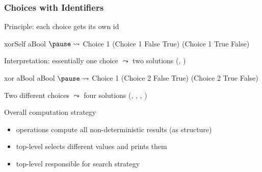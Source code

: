 \documentclass[10pt]{beamer}
\begin{document}
\begin{frame}[fragile]
\frametitle{Choices with Identifiers}

\begin{block}{Principle: each choice gets its own id}
\begin{curry}
xorSelf aBool $\pause\leadsto$
Choice 1 (Choice 1 False True) (Choice 1 True False)
\end{curry}
Interpretation: essentially one choice $\leadsto$ two solutions (, )
\pause
\bigskip
\begin{curry}
xor aBool aBool $\pause\leadsto$
Choice 1 (Choice 2 False True) (Choice 2 True False)
\end{curry}
\medskip
Two different choices $\leadsto$ four solutions (, , , )
\end{block}
\pause
\vfill

\begin{block}{Overall computation strategy}
\begin{itemize}\expandlist{0.5ex}
\item operations compute all non-deterministic results (as  structure)
\item top-level selects different values and prints them
\item top-level responsible for search strategy
\end{itemize}
\end{block}
\end{frame}
\end{document}

